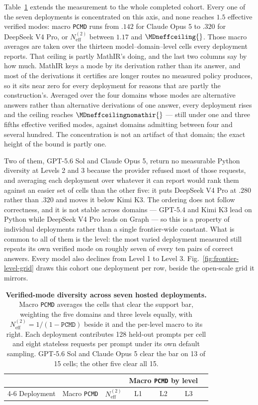 \documentclass{article}
\newcommand{\1}{\mathbf 1}
\newcommand{\pmd}{\texttt{PCMD}}
\newcommand{\neff}{\ensuremath{N^{(2)}_{\mathrm{eff}}}}
\theoremstyle{remark}
\theoremstyle{definition}
\theoremstyle{plain}
\begin{document}
Table~\ref{tab:hosted-cohort-mode-diversity} extends the measurement to the
whole completed cohort. Every one of the seven deployments is concentrated on
this axis, and none reaches $1.5$ effective verified modes: macro \pmd{} runs
from $.142$ for Claude Opus 5 to $.320$ for DeepSeek V4 Pro, or $\neff$ between
$1.17$ and $\MDneffceiling{}$. Those macro averages are taken over the thirteen
model--domain--level cells every deployment reports. That ceiling is partly
MathIR's doing, and the last two columns say by how much. MathIR keys a mode by
its derivation rather than its answer, and most of the derivations it certifies
are longer routes no measured policy produces, so it sits near zero for every
deployment for reasons that are partly the construction's. Averaged over the four domains whose modes are alternative answers rather than
alternative derivations of one answer, every deployment rises and the ceiling
reaches $\MDneffceilingnomathir{}$ --- still under one and three fifths
effective verified modes, against domains admitting between four and several
hundred.
The concentration is not an artifact of that domain; the exact height of the
bound is partly one.

 Two of them, GPT-5.6 Sol
and Claude Opus 5, return no measurable Python diversity at Levels 2 and 3
because the provider refused most of those requests, and averaging each
deployment over whatever it can report would rank them against an easier set of
cells than the other five: it puts DeepSeek V4 Pro at $.280$ rather than $.320$
and moves it below Kimi K3. The ordering does not follow correctness, and it is not stable
across domains --- GPT-5.4 and Kimi K3 lead on Python while DeepSeek V4 Pro
leads on Graph --- so this is a property of individual deployments rather than
a single frontier-wide constant. What is common to all of them is the level:
the most varied deployment measured still repeats its own verified mode on
roughly seven of every ten pairs of correct answers. Every model also declines
from Level 1 to Level 3. Fig.~\ref{fig:frontier-level-grid} draws this
cohort one deployment per row, beside the open-scale grid it mirrors.

\begin{table}[!htbp]
  \centering
  \caption{\textbf{Verified-mode diversity across seven hosted deployments.}
  Macro \pmd{} averages the cells that clear the support bar, weighting the
  five domains and three levels equally, with $\neff=1/(1-\pmd{})$ beside it
  and the per-level macro to its right. Each deployment contributes 128
  held-out prompts per cell and eight stateless requests per prompt under its
  own default sampling. GPT-5.6 Sol and Claude Opus 5 clear the bar on 13 of
  15 cells; the other five clear all 15.}
  \label{tab:hosted-cohort-mode-diversity}
  \small
  \begin{tabular}{lcccccc}
    \toprule
    & & & \multicolumn{3}{c}{Macro \pmd{} by level} \\
    \cmidrule(lr){4-6}
    Deployment & Macro \pmd{} & $\neff$ & L1 & L2 & L3 \\
    \midrule
    
  \end{tabular}
\end{table}
\end{document}
